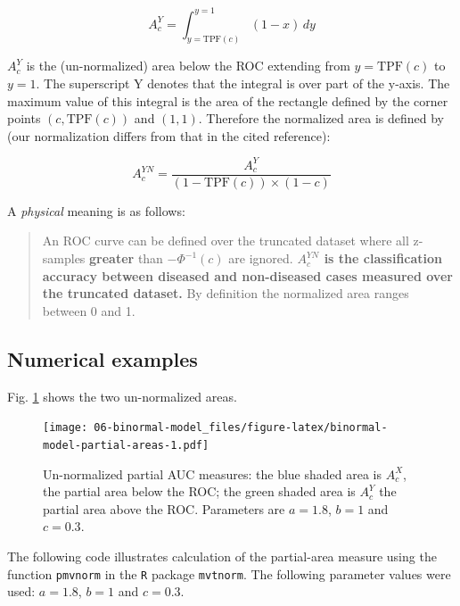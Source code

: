 \documentclass[
]{book}
\begin{document}
\begin{equation} 
A_c^{Y} = \int_{y=\text{TPF}(c)}^{y=1} \left (1-x  \right ) \, dy
\label{eq:binormal-model-partial-area-ac-metz}
\end{equation}

\(A_c^{Y}\) is the (un-normalized) area below the ROC extending from \(y = \text{TPF}(c)\) to \(y = 1\). The superscript Y denotes that the integral is over part of the y-axis. The maximum value of this integral is the area of the rectangle defined by the corner points \((c,\text{TPF}(c))\) and \((1,1)\). Therefore the normalized area is defined by (our normalization differs from that in the cited reference):

\begin{equation}
A_c^{YN} = \frac{A_c^{Y}}{\left (1 - \text{TPF}(c)  \right ) \times \left (1-c  \right )}
\label{eq:binormal-model-normalized-partial-auc-upper2}
\end{equation}

A \emph{physical} meaning is as follows:

\begin{quote}
An ROC curve can be defined over the truncated dataset where all z-samples \textbf{greater} than \(-\Phi^{-1}(c)\) are ignored. \textbf{\(A_c^{YN}\) is the classification accuracy between diseased and non-diseased cases measured over the truncated dataset.} By definition the normalized area ranges between 0 and 1.
\end{quote}

\hypertarget{binormal-model-metz-partial-auc-example}{%
\subsection{Numerical examples}\label{binormal-model-metz-partial-auc-example}}

Fig. \ref{fig:binormal-model-partial-areas} shows the two un-normalized areas.

\begin{figure}
\centering
\texttt{[image: 06-binormal-model\_files/figure-latex/binormal-model-partial-areas-1.pdf]}
\caption{\label{fig:binormal-model-partial-areas}Un-normalized partial AUC measures: the blue shaded area is \(A_c^{X}\), the partial area below the ROC; the green shaded area is \(A_c^{Y}\) the partial area above the ROC. Parameters are \(a = 1.8\), \(b = 1\) and \(c = 0.3\).}
\end{figure}

The following code illustrates calculation of the partial-area measure using the function \texttt{pmvnorm} in the \texttt{R} package \texttt{mvtnorm}. The following parameter values were used: \(a = 1.8\), \(b = 1\) and \(c = 0.3\).
\end{document}
